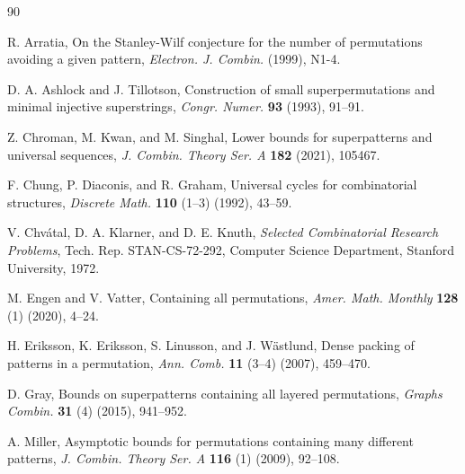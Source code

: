 \documentclass[a4paper,12pt]{article}
\theoremstyle{definition}
\numberwithin{equation}{section}
\begin{document}
\begin{thebibliography}{90}

R. Arratia, On the Stanley-Wilf conjecture for the number of permutations avoiding a given pattern, {\it Electron. J. Combin.} (1999), N1-4.

D. A. Ashlock and J. Tillotson, Construction of small superpermutations and minimal injective superstrings, {\it Congr. Numer.} {\bf 93} (1993), 91–91.

Z. Chroman, M. Kwan, and M. Singhal, Lower bounds for superpatterns and universal sequences, {\it J. Combin. Theory Ser. A} {\bf 182} (2021), 105467.

F. Chung, P. Diaconis, and R. Graham, Universal cycles for combinatorial structures, {\it Discrete Math.} {\bf 110} (1–3) (1992), 43–59.

V. Chvátal, D. A. Klarner, and D. E. Knuth, {\it Selected Combinatorial Research Problems}, Tech. Rep. STAN-CS-72-292, Computer Science Department, Stanford University, 1972.

M. Engen and V. Vatter, Containing all permutations, {\it Amer. Math. Monthly} {\bf 128} (1) (2020), 4–24.

H. Eriksson, K. Eriksson, S. Linusson, and J. Wästlund, Dense packing of patterns in a permutation, {\it Ann. Comb.} {\bf 11} (3–4) (2007), 459–470.

D. Gray, Bounds on superpatterns containing all layered permutations, {\it Graphs Combin.} {\bf 31} (4) (2015), 941–952.

A. Miller, Asymptotic bounds for permutations containing many different patterns, {\it J. Combin. Theory Ser. A} {\bf 116} (1) (2009), 92–108.

\end{thebibliography}
\end{document}
